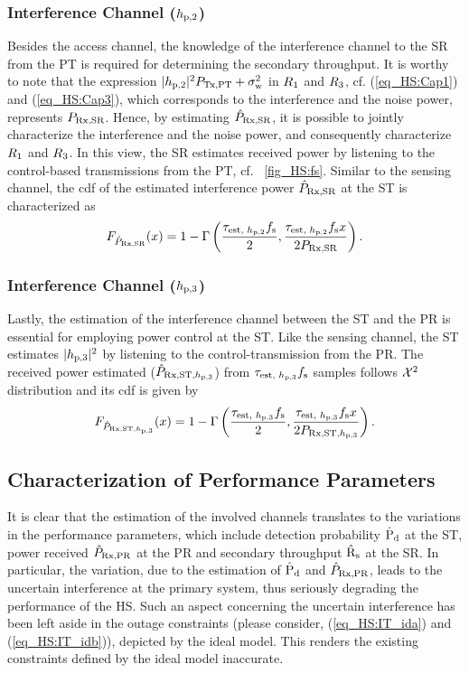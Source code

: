 \subsubsection*{Interference Channel ($h_{\text{p,2}}$)}
Besides the access channel, the knowledge of the interference channel to the SR from the PT is required for determining the secondary throughput. It is worthy to note that the expression $|h_{\text{p,2}}|^2 P_{\text{Tx,PT}} + \sigma^2_{\text{w}}$ in $R_{\text{1}}$ and $R_{\text{3}}$, cf. (\ref{eq_HS:Cap1}) and (\ref{eq_HS:Cap3}), which corresponds to the interference and the noise power, represents $P_{\text{Rx,SR}}$. Hence, by estimating $\hat{P}_{\text{Rx,SR}}$, it is possible to jointly characterize the interference and the noise power, and consequently characterize $R_{\text{1}}$ and $R_{\text{3}}$.  
In this view, the SR estimates received power by listening to the control-based transmissions from the PT, cf. \figurename~\ref{fig_HS:fs}. Similar to the sensing channel, the cdf of the estimated interference power $\hat{P}_{\text{Rx,SR}}$ at the ST is characterized as
\begin{align}
F_{\hat{P}_{\text{Rx,SR}}}(x) = 1 - \Gamma \left( \frac{\tau_{\text{est, $h_{\text{p,2}}$}} f_{\text{s}}}{2}, \frac{\tau_{\text{est, $h_{\text{p,2}}$}} f_{\text{s}} x}{2 P_{\text{Rx,SR}}} \right) \label{eq_HS:fprcvdsr}.
\end{align}

  

\subsubsection*{Interference Channel ($h_{\text{p,3}}$)}
Lastly, the estimation of the interference channel between the ST and the PR is essential for employing power control at the ST. Like the sensing channel, the ST estimates $|h_{\text{p,3}}|^2$ by listening to the control-transmission from the PR. The received power estimated ($\hat{P}_{\text{Rx,ST,$h_{\text{p,3}}$}}$) from $\tau_{\text{est, $h_{\text{p,3}}$}} f_{\text{s}}$ samples follows $\cchi2$ distribution and its cdf is given by  
\begin{align}
F_{\hat{P}_{\text{Rx,ST,$h_{\text{p,3}}$}}}(x) = 1 - \Gamma \left( \frac{\tau_{\text{est, $h_{\text{p,3}}$}} f_{\text{s}}}{2}, \frac{\tau_{\text{est, $h_{\text{p,3}}$}} f_{\text{s}} x}{2 P_{\text{Rx,ST,$h_{\text{p,3}}$}}} \right) \label{eq_HS:fprcvdstpr}.
\end{align}

\subsection{Characterization of Performance Parameters}
It is clear that the estimation of the involved channels translates to the variations in the performance parameters, which include detection probability $\hat{\text{P}}_{\text{d}}$ at the ST, power received $\hat{P}_{\text{Rx,PR}}$ at the PR and secondary throughput $\hat{\text{{R}}}_{\text{s}}$ at the SR. In particular, the variation, due to the estimation of $\hat{\text{P}}_{\text{d}}$ and $\hat{P}_{\text{Rx,PR}}$, leads to the uncertain interference at the primary system, thus seriously degrading the performance of the HS. Such an aspect concerning the uncertain interference has been left aside in the outage constraints (please consider, (\ref{eq_HS:IT_ida}) and (\ref{eq_HS:IT_idb})), depicted by the ideal model. This renders the existing constraints defined by the ideal model inaccurate. 

